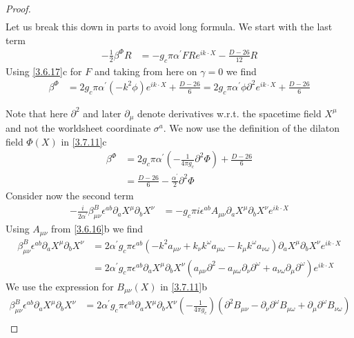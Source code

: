 \begin{tcolorbox}[breakable]
\begin{proof}
\begin{align}
	\end{align}
	Let us break this down in parts to avoid long formula. We start with the last term
	\begin{align}
		-\frac{1}{2} \beta^\Phi R &= -g_c \pi \alpha^{\prime} F R e^{i k \cdot X} - \frac{D-26}{12} R
	\end{align}
	Using \eqref{3.6.17}c for $F$ and taking from here on $\gamma=0$ we find
	\begin{align}
		\beta^\Phi &= 2 g_c \pi \alpha^{\prime}\left(-k^2 \phi\right) e^{i k \cdot X} + \frac{D-26}{6} = 2 g_c \pi \alpha^{\prime} \phi \partial^2 e^{i k \cdot X} + \frac{D-26}{6}
	\end{align}
	
	Note that here $\partial^2$ and later $\partial_\mu$ denote derivatives w.r.t. the spacetime field $X^\mu$ and not the worldsheet coordinate $\sigma^a$. We now use the definition of the dilaton field $\Phi(X)$ in \eqref{3.7.11}c
	\begin{align}
		\beta^\Phi &= 2 g_c \pi \alpha^{\prime}\left(-\frac{1}{4 \pi g_c} \partial^2 \Phi\right) + \frac{D-26}{6} \nonumber \\
		&= \frac{D-26}{6} - \frac{\alpha^{\prime}}{2} \partial^2 \Phi
	\end{align}
	Consider now the second term
	\begin{align}
		-\frac{i}{2 \alpha^{\prime}} \beta_{\mu \nu}^B \epsilon^{a b} \partial_a X^\mu \partial_b X^\nu &= -g_c \pi i \epsilon^{a b} A_{\mu \nu} \partial_a X^\mu \partial_b X^\nu e^{i k \cdot X}
	\end{align}
	Using $A_{\mu \nu}$ from \eqref{3.6.16}b we find
	\begin{align}
		\beta_{\mu \nu}^B \epsilon^{a b} \partial_a X^\mu \partial_b X^\nu &= 2 \alpha^{\prime} g_c \pi \epsilon^{a b}\left(-k^2 a_{\mu \nu} + k_\nu k^\omega a_{\mu \omega} - k_\mu k^\omega a_{\nu \omega}\right) \partial_a X^\mu \partial_b X^\nu e^{i k \cdot X} \nonumber \\
		&= 2 \alpha^{\prime} g_c \pi \epsilon^{a b} \partial_a X^\mu \partial_b X^\nu\left(a_{\mu \nu} \partial^2 - a_{\mu \omega} \partial_\nu \partial^\omega + a_{\nu \omega} \partial_\mu \partial^\omega\right) e^{i k \cdot X}
	\end{align}
	We use the expression for $B_{\mu \nu}(X)$ in \eqref{3.7.11}b
	\begin{align}
		\beta_{\mu \nu}^B \epsilon^{a b} \partial_a X^\mu \partial_b X^\nu &= 2 \alpha^{\prime} g_c \pi \epsilon^{a b} \partial_a X^\mu \partial_b X^\nu\left(-\frac{1}{4 \pi g_c}\right)\left(\partial^2 B_{\mu \nu} - \partial_\nu \partial^\omega B_{\mu \omega} + \partial_\mu \partial^\omega B_{\nu \omega}\right) \nonumber \\

\end{align}
\end{proof}
\end{tcolorbox}
